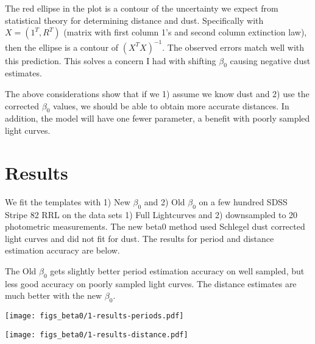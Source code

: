 \documentclass[12pt]{article}
\begin{document}
The red ellipse in the plot is a contour of the uncertainty we expect from statistical theory for determining distance and dust. Specifically with $X = (1^T,R^T)$ (matrix with first column 1's and second column extinction law), then the ellipse is a contour of $(X^TX)^{-1}$. The observed errors match well with this prediction. This solves a concern I had with shifting $\beta_0$ causing negative dust estimates.

The above considerations show that if we 1) assume we know dust and 2) use the corrected $\beta_0$ values, we should be able to obtain more accurate distances. In addition, the model will have one fewer parameter, a benefit with poorly sampled light curves.


\section{Results}

We fit the templates with 1) New $\beta_0$ and 2) Old $\beta_0$ on a few hundred SDSS Stripe 82 RRL on the data sets 1) Full Lightcurves and 2) downsampled to 20 photometric measurements. The new beta0 method used Schlegel dust corrected light curves and did not fit for dust. The results for period and distance estimation accuracy are below.

The Old $\beta_0$ gets slightly better period estimation accuracy on well sampled, but less good accuracy on poorly sampled light curves. The distance estimates are much better with the new $\beta_0$.

\begin{center}
  \texttt{[image: figs\_beta0/1-results-periods.pdf]}
\end{center}

\begin{center}
  \texttt{[image: figs\_beta0/1-results-distance.pdf]}
\end{center}


%
%
\end{document}
